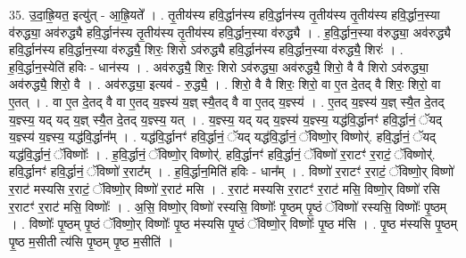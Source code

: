 \documentclass[17pt]{extarticle}
\begin{document}
35. उ॒दा॒ह्रि॒यत॒ इत्यु॑त् - आ॒ह्रि॒यते᳚ । . तृ॒तीय॑स्य हवि॒र्द्धान॑स्य हवि॒र्द्धान॑स्य तृ॒तीय॑स्य तृ॒तीय॑स्य हवि॒र्द्धान॒स्या व॑रुद्ध्या॒ अव॑रुद्ध्यै हवि॒र्द्धान॑स्य तृ॒तीय॑स्य तृ॒तीय॑स्य हवि॒र्द्धान॒स्या व॑रुद्ध्यै । . ह॒वि॒र्द्धान॒स्या व॑रुद्ध्या॒ अव॑रुद्ध्यै हवि॒र्द्धान॑स्य हवि॒र्द्धान॒स्या व॑रुद्ध्यै॒ शिरः॒ शिरो ऽव॑रुद्ध्यै हवि॒र्द्धान॑स्य हवि॒र्द्धान॒स्या व॑रुद्ध्यै॒ शिरः॑ । . ह॒वि॒र्द्धान॒स्येति॑ हविः - धान॑स्य । . अव॑रुद्ध्यै॒ शिरः॒ शिरो ऽव॑रुद्ध्या॒ अव॑रुद्ध्यै॒ शिरो॒ वै वै शिरो ऽव॑रुद्ध्या॒ अव॑रुद्ध्यै॒ शिरो॒ वै । . अव॑रुद्ध्या॒ इत्यव॑ - रु॒द्ध्यै॒ । . शिरो॒ वै वै शिरः॒ शिरो॒ वा ए॒त दे॒तद् वै शिरः॒ शिरो॒ वा ए॒तत् । . वा ए॒त दे॒तद् वै वा ए॒तद् य॒ज्ञ्स्य॑ य॒ज्ञ् स्यै॒तद् वै वा ए॒तद् य॒ज्ञ्स्य॑ । . ए॒तद् य॒ज्ञ्स्य॑ य॒ज्ञ् स्यै॒त दे॒तद् य॒ज्ञ्स्य॒ यद् यद् य॒ज्ञ् स्यै॒त दे॒तद् य॒ज्ञ्स्य॒ यत् । . य॒ज्ञ्स्य॒ यद् यद् य॒ज्ञ्स्य॑ य॒ज्ञ्स्य॒ यद्ध॑वि॒र्द्धानꣳ॑ हवि॒र्द्धानं॒ ॅयद् य॒ज्ञ्स्य॑ य॒ज्ञ्स्य॒ यद्ध॑वि॒र्द्धान᳚म् । . यद्ध॑वि॒र्द्धानꣳ॑ हवि॒र्द्धानं॒ ॅयद् यद्ध॑वि॒र्द्धानं॒ ॅविष्णो॒र् विष्णोर्॑. हवि॒र्द्धानं॒ ॅयद् यद्ध॑वि॒र्द्धानं॒ ॅविष्णोः᳚ । . ह॒वि॒र्द्धानं॒ ॅविष्णो॒र् विष्णोर्॑. हवि॒र्द्धानꣳ॑ हवि॒र्द्धानं॒ ॅविष्णो॑ र॒राटꣳ॑ र॒राटं॒ ॅविष्णोर्॑. हवि॒र्द्धानꣳ॑ हवि॒र्द्धानं॒ ॅविष्णो॑ र॒राट᳚म् । . ह॒वि॒र्द्धान॒मिति॑ हविः - धान᳚म् । . विष्णो॑ र॒राटꣳ॑ र॒राटं॒ ॅविष्णो॒र् विष्णो॑ र॒राट॑ मस्यसि र॒राटं॒ ॅविष्णो॒र् विष्णो॑ र॒राट॑ मसि । . र॒राट॑ मस्यसि र॒राटꣳ॑ र॒राट॑ मसि॒ विष्णो॒र् विष्णो॑ रसि र॒राटꣳ॑ र॒राट॑ मसि॒ विष्णोः᳚ । . अ॒सि॒ विष्णो॒र् विष्णो॑ रस्यसि॒ विष्णोः᳚ पृ॒ष्ठम् पृ॒ष्ठं ॅविष्णो॑ रस्यसि॒ विष्णोः᳚ पृ॒ष्ठम् । . विष्णोः᳚ पृ॒ष्ठम् पृ॒ष्ठं ॅविष्णो॒र् विष्णोः᳚ पृ॒ष्ठ म॑स्यसि पृ॒ष्ठं ॅविष्णो॒र् विष्णोः᳚ पृ॒ष्ठ म॑सि । . पृ॒ष्ठ म॑स्यसि पृ॒ष्ठम् पृ॒ष्ठ म॒सीती त्य॑सि पृ॒ष्ठम् पृ॒ष्ठ म॒सीति॑ । \newline
\end{document}
